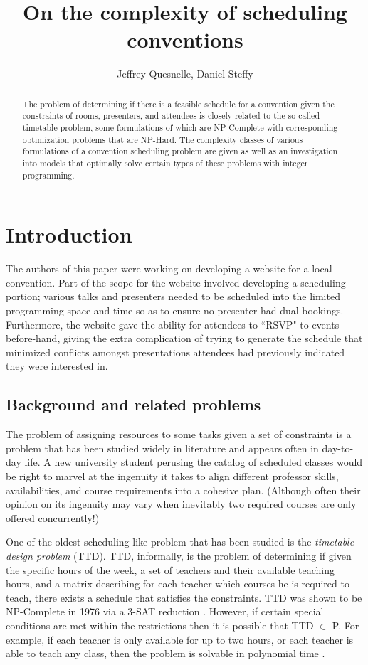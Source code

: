 \documentclass[]{article}
\title{On the complexity of scheduling conventions}
\author{Jeffrey Quesnelle, Daniel Steffy}
\theoremstyle{definition}
\theoremstyle{remark}
\numberwithin{equation}{section}
\begin{document}
\maketitle

\begin{abstract}
The problem of determining if there is a feasible schedule for a convention given the constraints of rooms, presenters, and attendees is closely related to the so-called timetable problem, some formulations of which are NP-Complete with corresponding optimization problems that are NP-Hard. The complexity classes of various formulations of a convention scheduling problem are given as well as an investigation into models that optimally solve certain types of these problems with integer programming.
\end{abstract}

\section{Introduction}

The authors of this paper were working on developing a website for a local convention. Part of the scope for the website involved developing a scheduling portion; various talks and presenters needed to be scheduled into the limited programming space and time so as to ensure no presenter had dual-bookings. Furthermore, the website gave the ability for attendees to ``RSVP" to events before-hand, giving the extra complication of trying to generate the schedule that minimized conflicts amongst presentations attendees had previously indicated they were interested in.

\subsection{Background and related problems}
The problem of assigning resources to some tasks given a set of constraints is a problem that has been studied widely in literature and appears often in day-to-day life. A new university student perusing the catalog of scheduled classes would be right to marvel at the ingenuity it takes to align different professor skills, availabilities, and course requirements into a cohesive plan. (Although often their opinion on its ingenuity may vary when inevitably two required courses are only offered concurrently!)  

One of the oldest scheduling-like problem that has been studied is the \emph{timetable design problem} (TTD). TTD, informally, is the problem of determining if given the specific hours of the week, a set of teachers and their available teaching hours, and a matrix describing for each teacher which courses he is required to teach, there exists a schedule that satisfies the constraints. TTD was shown to be NP-Complete in 1976 via a 3-SAT reduction \cite{even76}. However, if certain special conditions are met within the restrictions then it is possible that TTD $\in$ P. For example, if each teacher is only available for up to two hours, or each teacher is able to teach any class, then the problem is solvable in polynomial time \cite{garey76}.
\end{document}

